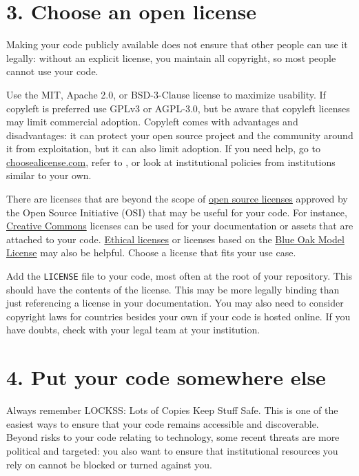 \documentclass[10pt,letterpaper]{article}
\begin{document}
\section*{3. Choose an open license}

Making your code publicly available does not ensure that other people can use it legally:
without an explicit license,
you maintain all copyright,
so most people cannot use your code.

Use the MIT, Apache 2.0, or BSD-3-Clause license to maximize usability.
If copyleft is preferred use GPLv3 or AGPL-3.0,
but be aware that copyleft licenses may limit commercial adoption.
Copyleft comes with advantages and disadvantages:
it can protect your open source project and the community around it from exploitation,
but it can also limit adoption.
If you need help,
go to \href{http://choosealicense.com}{choosealicense.com},
refer to \cite{Furtonato2021},
or look at institutional policies from institutions similar to your own.

There are licenses that are beyond the scope of
\href{https://opensource.org/licenses}{open source licenses}
approved by the Open Source Initiative (OSI)
that may be useful for your code.
For instance,
\href{https://creativecommons.org/}{Creative Commons} licenses can be used for your documentation
or assets that are attached to your code.
\href{https://ethicalsource.dev/}{Ethical licenses}
or licenses based on the \href{https://blueoakcouncil.org/license/1.0.0}{Blue Oak Model License} may also be helpful.
Choose a license that fits your use case.

Add the \texttt{LICENSE} file to your code,
most often at the root of your repository.
This should have the contents of the license.
This may be more legally binding than just referencing a license in your documentation.
You may also need to consider copyright laws for countries besides your own if your code is hosted online.
If you have doubts,
check with your legal team at your institution.

\section*{4. Put your code somewhere else}

Always remember LOCKSS: Lots of Copies Keep Stuff Safe.
This is one of the easiest ways to ensure that your code remains accessible and discoverable.
Beyond risks to your code relating to technology,
some recent threats are more political and targeted:
you also want to ensure that institutional resources you rely on cannot be blocked or turned against you.
\end{document}
